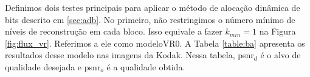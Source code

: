 Definimos dois testes principais para aplicar o método de alocação dinâmica de bits descrito em \ref{sec:adb}. No primeiro, não restringimos o número mínimo de níveis de reconstrução em cada bloco. Isso equivale a fazer $k_{min} = 1$ na Figura \ref{fig:flux_vr}. Referimos  a ele como modeloVR0.  A Tabela \ref{table:ba} apresenta os resultados desse modelo nas imagens da Kodak. Nessa tabela, \acrshort{psnr}$_d$ é o alvo de qualidade desejada e \acrshort{psnr}$_o$ é a qualidade obtida. 



\begin{table}[h]
	\caption{Resultados do Método de Alocação Dinâmica de Bits}
	\centering
\end{table}
